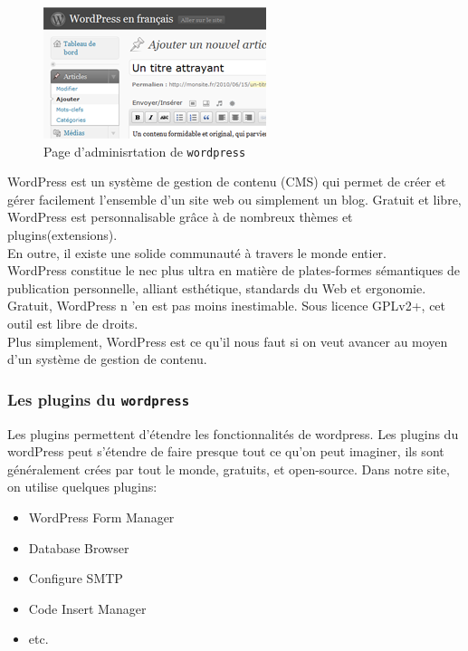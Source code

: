 \begin{figure}
\includegraphics[scale=0.8]{images/wordpress.png}
\caption{Page d'adminisrtation de \texttt{wordpress}}
\end{figure}


WordPress est un système de gestion de contenu (CMS) qui permet de créer et gérer facilement l'ensemble d'un site web ou simplement un blog. Gratuit et libre, WordPress est personnalisable grâce à de nombreux thèmes et plugins(extensions).\\

En outre, il existe une solide communauté à travers le monde entier.\\

WordPress constitue le nec plus ultra en matière de plates-formes sémantiques de publication personnelle, alliant esthétique, standards du Web et ergonomie. Gratuit, WordPress n ’en est pas moins inestimable. Sous licence GPLv2+, cet outil est libre de droits.\\

Plus simplement, WordPress est ce qu’il nous faut si on veut avancer au moyen d’un système de gestion de contenu.\\





    \subsubsection{Les plugins du \texttt{wordpress}}
Les plugins permettent d'étendre les fonctionnalités de wordpress. Les plugins du wordPress peut s'étendre de faire presque tout ce qu'on peut imaginer, ils sont généralement crées par tout le monde, gratuits, et open-source. Dans notre site, on utilise quelques plugins:\\

\begin{itemize}
\item WordPress Form Manager
\item Database Browser
\item Configure SMTP
\item Code Insert Manager
\item etc.
\end{itemize}

